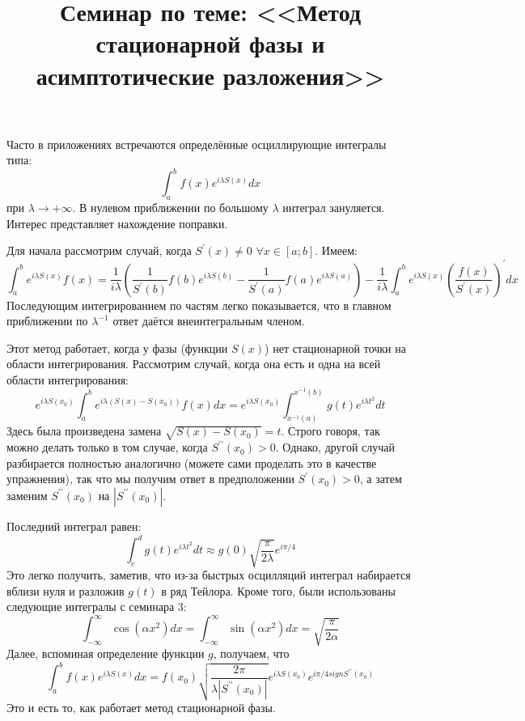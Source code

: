\documentclass[a4paper,12pt]{article}
\begin{document}
\title{Семинар по теме: <<Метод стационарной фазы и асимптотические разложения>>}
\maketitle

\noindent
Часто в приложениях встречаются определённые осциллирующие интегралы
типа: 
\[
\int_{a}^{b}f(x)e^{i\lambda S(x)}dx
\]
при $\lambda\to+\infty$. В нулевом приближении по большому $\lambda$ интеграл зануляется. Интерес представляет нахождение поправки.  

\noindent
Для начала рассмотрим случай, когда $S^{'}(x)\ne0$ $\forall x\in [a;b]$. Имеем:
$$
\int_{a}^{b}e^{i\lambda S(x)}f(x)=\frac{1}{i\lambda}\left(\frac{1}{S^{\prime}(b)}f(b)e^{i\lambda S(b)}-\frac{1}{S^{\prime}(a)}f(a)e^{i\lambda S(a)}\right)-\frac{1}{i\lambda}\int_{a}^{b}e^{i\lambda S(x)}\left(\frac{f(x)}{S^{\prime}(x)}\right)^{\prime}dx
$$
Последующим интегрированием по частям легко показывается, что в главном приближении по $\lambda^{-1}$ ответ даётся внеинтегральным членом.

\noindent
Этот метод работает, когда у фазы (функции $S(x)$) нет стационарной точки на области интегрирования. Рассмотрим случай, когда она есть и одна на всей области интегрирования:
$$
e^{i\lambda S(x_0)}\int_{a}^{b}e^{i\lambda( S(x)-S(x_0))}f(x)dx=e^{i\lambda S(x_0)}\int_{x^{-1}(a)}^{x^{-1}(b)}g(t)e^{i\lambda t^2}dt
$$
Здесь была произведена замена $\sqrt{S(x)-S(x_0)}=t$. Строго говоря, так можно делать только в том случае, когда $S^{\prime\prime}(x_0)>0$. Однако, другой случай разбирается полностью аналогично (можете сами проделать это в качестве упражнения), так что мы получим ответ в предположении $S^{\prime}(x_0)>0$, а затем заменим $S^{\prime\prime}(x_0)$ на $|S^{\prime\prime}(x_0)|$. 

\noindent
Последний интеграл равен:
$$
\int_{c}^{d}g(t)e^{i\lambda t^2}dt\approx g(0)\sqrt{\frac{\pi}{2\lambda}}e^{i\pi/4}
$$
Это легко получить, заметив, что из-за быстрых осцилляций интеграл набирается вблизи нуля и разложив $g(t)$ в ряд Тейлора. Кроме того, были использованы следующие интегралы с семинара 3:
\[
\int_{-\infty}^{\infty}\cos(\alpha x^{2})dx=\int_{-\infty}^{\infty}\sin(\alpha x^{2})dx=\sqrt{\frac{\pi}{2\alpha}}
\]
Далее, вспоминая определение функции $g$, получаем, что 
$$
\int_{a}^{b}f(x)e^{i\lambda S(x)}dx=f(x_0)\sqrt{\frac{2\pi}{\lambda |S^{\prime\prime}(x_0)|}}e^{i\lambda S(x_0)}e^{i\pi/4 sign S^{\prime\prime}(x_0)}
$$
Это и есть то, как работает метод стационарной фазы.
\end{document}

